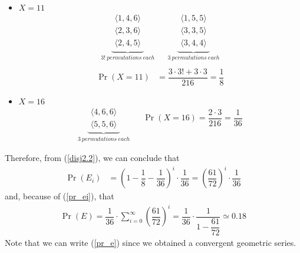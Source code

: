 \begin{itemize}

	\item $X = 11$
	\begin{align*}
		\underbrace{
			\begin{aligned}
				\langle 1,4,6 \rangle\\
				\langle 2,3,6 \rangle\\
				\langle 2,4,5 \rangle
			\end{aligned}
		}_{ 3! \ permutations \ each}
		&&\underbrace{
			\begin{aligned}
				\langle 1,5,5 \rangle\\
				\langle 3,3,5 \rangle\\
				\langle 3,4,4 \rangle
			\end{aligned}
		}_{ 3 \ permutations \ each}\\
	\end{align*}
	\begin{align*}
		\Pr(X = 11) &= \dfrac{3 \cdot 3! + 3 \cdot 3}{216} = \dfrac{1}{8}
	\end{align*}
	
	\item $X = 16$
	\begin{align*}
		\underbrace{
			\begin{aligned}
				\langle 4,6,6 \rangle\\
				\langle 5,5,6 \rangle
			\end{aligned}
		}_{ 3 \ permutations \ each}
		&&\Pr(X = 16) = \dfrac{2 \cdot 3}{216} = \dfrac{1}{36}
	\end{align*}

\end{itemize}
Therefore, from (\ref{disj2.2}), we can conclude that
\begin{align}
	\Pr(E_i) &= \left( 1 - \dfrac{1}{8} - \dfrac{1}{36} \right)^i \cdot \dfrac{1}{36} = \left( \dfrac{61}{72} \right)^i \cdot \dfrac{1}{36} \label{pr_ei}
\end{align}
and, because of (\ref{pr_ei}), that
\begin{align}
	\Pr(E) = \dfrac{1}{36} \cdot \sum_{i = 0}^{\infty}\left( \dfrac{61}{72} \right)^i = \dfrac{1}{36} \cdot \dfrac{1}{1 - \dfrac{61}{72}} \simeq 0.18 \label{pr_e}
\end{align}
Note that we can write (\ref{pr_e}) since we obtained a convergent geometric series.\\
